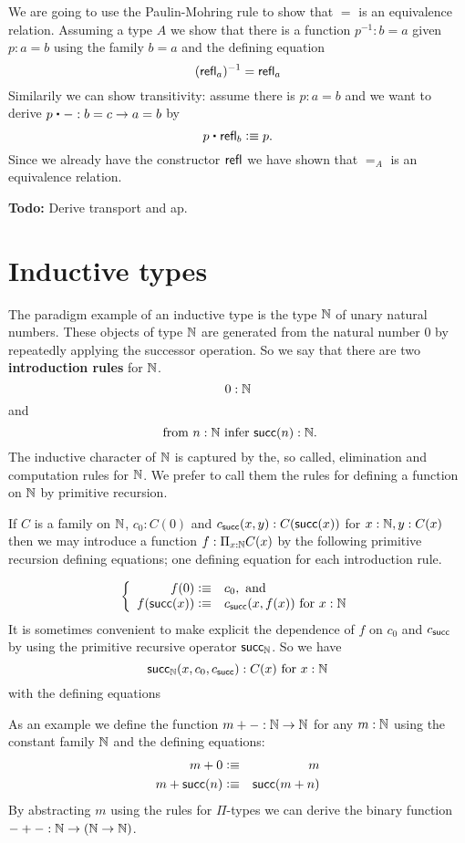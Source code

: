 {We are going to use the Paulin-Mohring rule to show that $=$ is an
equivalence relation. Assuming a type $A$ we show that there is a function
$p^{-1} : b = a$ given $p : a = b$ using the family $b = a$ and
the defining equation
\[ (\mathsf{refl}_{a})^{-1} = \mathsf{refl}_{a} \]
Similarily we can show transitivity: assume there is $p : a = b$ and
we want to derive $p \ct - : b = c \to a = b$ by
\[ p \ct \refl{b} \defeq p.\]
Since we already have the constructor $\mathsf{refl}_{}$ we have shown that $=_A$
is an equivalence relation. 


\textbf{Todo:} Derive transport and ap.

\section{Inductive types}
\label{sec:inductive-types}

The paradigm example of an inductive type is the type $\mathbb{N}$ of unary natural numbers.  These objects of type $\mathbb{N}$ are generated from the natural number $0$ by repeatedly applying the successor operation.  So we say that there are two {\bf introduction rules} for $\mathbb{N}$. 
  \[ 0:\mathbb{N}\]
and
  \[ \mbox{ from $n:\mathbb{N}$ infer $\mathsf{succ}(n):\mathbb{N}$}.\]
The inductive character of $\mathbb{N}$ is captured by the, so called, elimination and computation rules for $\mathbb{N}$.  We prefer to call them the rules for defining a function on $\mathbb{N}$ by primitive recursion. 

If $C$ is a family on $\mathbb{N}$, $c_0:C(0)$ and $c_{\mathsf{succ}}(x,y):C(\mathsf{succ}(x))$ for $x:\mathbb{N},y:C(x)$ then we may introduce a function $f:\Pi_{x:\mathbb{N}}C(x)$ by the following primitive recursion defining equations; one defining equation for each introduction rule.

  \[\left\{\begin{array}{rl}
f(0)\vcentcolon\equiv& c_0, \mbox{ and}\\
f(\mathsf{succ}(x))\vcentcolon\equiv& c_{\mathsf{succ}}(x,f(x))\mbox{ for } x:\mathbb{N}
  \end{array}\right.\]
It is sometimes convenient to make explicit the dependence of $f$ on $c_0$ and $c_{\mathsf{succ}}$ by using the primitive recursive operator $\mathsf{succ}_\mathbb{N}$.  So we have
  \[ \mathsf{succ}_\mathbb{N}(x,c_0,c_{\mathsf{succ}}):C(x)\mbox{ for } x:\mathbb{N}\]
with the defining equations


As an example we define the function $m + - : \mathbb{N} \to \mathbb{N}$ for any
$m : \mathbb{N}$ using the constant family $\mathbb{N}$ and the defining
equations:
\begin{eqnarray*}
  m + 0 & \vcentcolon\equiv & m \\
  m + \mathsf{succ}(n) & \vcentcolon\equiv & \mathsf{succ}(m + n)
\end{eqnarray*}
By abstracting $m$ using the rules for $\Pi$-types we can derive the
binary function $- + - : \mathbb{N} \to (\mathbb{N} \to \mathbb{N})$.

}
